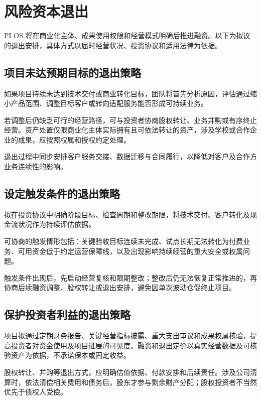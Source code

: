 \section{风险资本退出}\label{sec:7.3}
PI OS 将在商业化主体、成果使用权限和经营模式明确后推进融资。以下为拟议的退出安排，具体方式以届时经营状况、投资协议和适用法律为依据。

\subsection{项目未达预期目标的退出策略}\label{sec:7.3.1}
如果项目持续未达到技术交付或商业转化目标，团队将首先分析原因，评估通过缩小产品范围、调整目标客户或转向适配服务能否形成可持续业务。

若调整后仍缺乏可行的经营路径，可与投资者协商股权转让、业务并购或有序终止经营。资产处置仅限商业化主体实际拥有且可依法转让的资产，涉及学校或合作企业的成果，应按照权属和授权约定处理。

退出过程中同步安排客户服务交接、数据迁移与合同履行，以降低对客户及合作方业务连续性的影响。

\subsection{设定触发条件的退出策略}\label{sec:7.3.2}
拟在投资协议中明确阶段目标、检查周期和整改期限，将技术交付、客户转化及现金流状况作为持续评估依据。

可协商的触发情形包括：关键验收目标连续未完成、试点长期无法转化为付费业务、可用资金低于约定运营保障线，以及出现影响持续经营的重大安全或权属问题。

触发条件出现后，先启动经营复核和限期整改；整改后仍无法恢复正常推进的，再协商后续融资调整、股权转让或退出安排，避免因单次波动仓促终止项目。

\subsection{保护投资者利益的退出策略}\label{sec:7.3.3}
项目拟通过定期财务报告、关键经营指标披露、重大支出审议和成果权属核验，提高投资者对资金使用及项目进展的可见度。融资和退出定价以真实经营数据及可核验资产为依据，不承诺保本或固定收益。

股权转让、并购等退出方式，应明确估值依据、付款安排和后续责任。涉及公司清算时，依法清偿相关费用和债务后，股东才参与剩余财产分配；股权投资者不当然优先于债权人受偿。

